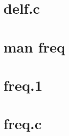 \documentclass[titlepage, a4paper]{article}
\begin{document}
\section{delf.c}
\newpage

\section{man freq}


\section{freq.1}
\newpage

\section{freq.c}
\end{document}
